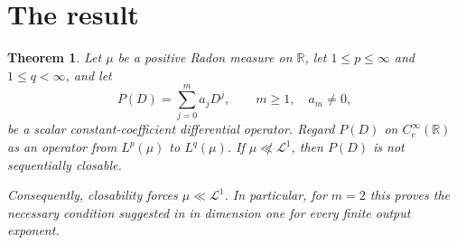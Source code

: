 \documentclass[11pt]{article}
\newtheorem{theorem}{Theorem}
\newcommand{\R}{\mathbb R}
\newcommand{\Leb}{\mathcal L^1}
\begin{document}
\section{The result}

\begin{theorem}\label{thm:main}
Let $\mu$ be a positive Radon measure on $\R$, let
$1\le p\le\infty$ and $1\le q<\infty$, and let
\[
  P(D)=\sum_{j=0}^{m}a_jD^j,
  \qquad m\ge1,\quad a_m\ne0,
\]
be a scalar constant-coefficient differential operator.  Regard $P(D)$ on
$C_c^\infty(\R)$ as an operator from $L^p(\mu)$ to $L^q(\mu)$.
If $\mu\not\ll\Leb$, then $P(D)$ is not sequentially closable.

Consequently, closability forces $\mu\ll\Leb$.  In particular, for $m=2$
this proves the necessary condition suggested in \cite[Remark~1.7(iv)]{ABM}
in dimension one for every finite output exponent.
\end{theorem}
\end{document}
